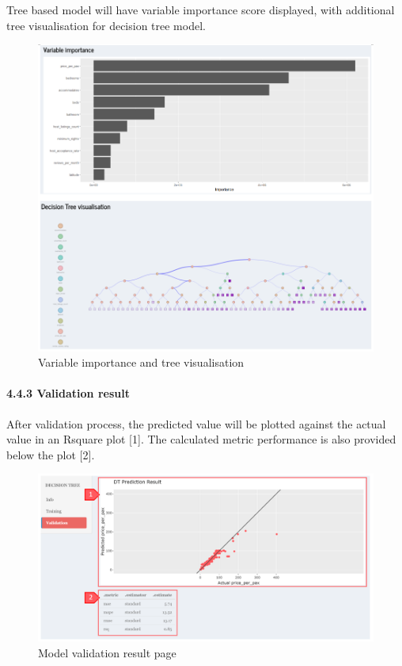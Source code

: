 \documentclass[
  12pt,
]{article}
\begin{document}
Tree based model will have variable importance score displayed, with
additional tree visualisation for decision tree model.

\begin{figure}[H]

{\centering \includegraphics[width=0.95\linewidth]{images/mdltrain6} 

}

\caption{Variable importance and tree visualisation}\label{fig:unnamed-chunk-31}
\end{figure}

\hypertarget{validation-result}{%
\paragraph{4.4.3 Validation result}\label{validation-result}}

After validation process, the predicted value will be plotted against
the actual value in an Rsquare plot {[}1{]}. The calculated metric
performance is also provided below the plot {[}2{]}.

\begin{figure}[H]

{\centering \includegraphics[width=0.95\linewidth]{images/mdltrain7} 

}

\caption{Model validation result page}\label{fig:unnamed-chunk-32}
\end{figure}
\end{document}

